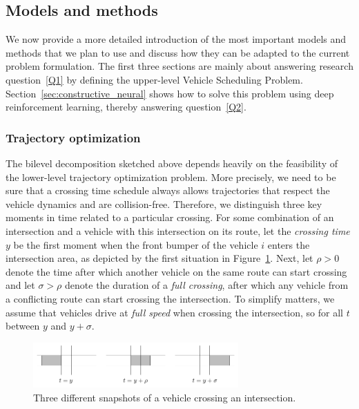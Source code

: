 \documentclass{article}
\theoremstyle{definition}
\theoremstyle{plain}
\begin{document}
\subsection{Models and methods}

We now provide a more detailed introduction of the most important models and
methods that we plan to use and discuss how they can be adapted to the current
problem formulation. The first three sections are mainly about answering
research question~\ref{Q1} by defining the upper-level Vehicle Scheduling
Problem. Section~\ref{sec:constructive_neural} shows how to solve this problem
using deep reinforcement learning, thereby answering question~\ref{Q2}.

\subsubsection{Trajectory optimization}

The bilevel decomposition sketched above depends heavily on the feasibility of
the lower-level trajectory optimization problem. More precisely, we need to be
sure that a crossing time schedule always allows trajectories that respect the
vehicle dynamics and are collision-free.
Therefore, we distinguish three key moments in time related to a particular
crossing. For some combination of an intersection and a vehicle with this
intersection on its route, let the \textit{crossing time} $y$ be the first
moment when the front bumper of the vehicle $i$ enters the intersection area, as
depicted by the first situation in Figure~\ref{fig:vehicle_crossing}. Next, let
$\rho > 0$ denote the time after which another vehicle on the same route can
start crossing and let $\sigma > \rho$ denote the duration of a \textit{full crossing},
after which any vehicle from a conflicting route can start
crossing the intersection.
To simplify matters, we assume that vehicles drive at \textit{full speed} when crossing
the intersection, so for all $t$ between $y$ and $y + \sigma$.

\begin{figure}[h]
  \centering
  \includegraphics[width=0.7\textwidth]{figures/vehicle_crossing.pdf}
  \caption{Three different snapshots of a vehicle crossing an intersection.}
  \label{fig:vehicle_crossing}
\end{figure}
\end{document}
